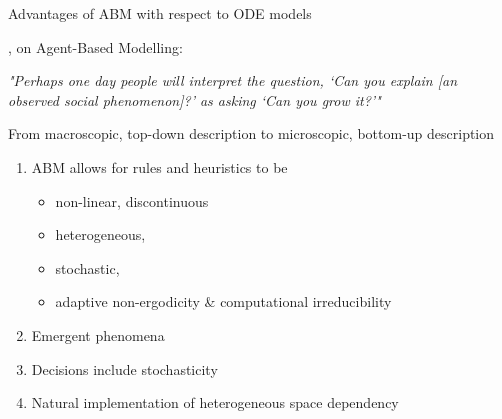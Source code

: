 \begin{frame}{Advantages of ABM with respect to ODE models}


 	 	\begin{framed}
 	 		 \citet{Epstein1996}, \citet{Bonabeau2002} on Agent-Based Modelling:
 			\begin{center}
 				\textit{"Perhaps one day people will interpret the question, ‘Can you explain [an observed social phenomenon]?’ as asking `Can you grow it?’"
} 			\end{center}
 		\end{framed}

	From macroscopic, top-down description \ra to microscopic, bottom-up description
	\begin{enumerate}
		\item ABM allows for rules and heuristics to be 
		\begin{itemize}
			\item non-linear, discontinuous
			\item heterogeneous,
			\item stochastic, 
			\item adaptive \newline
			\ra non-ergodicity \& computational irreducibility
		\end{itemize}
		\pause\item \ra Emergent phenomena
		\pause\item Decisions include stochasticity
		\pause\item Natural implementation of heterogeneous space dependency
	\end{enumerate}
\end{frame}


